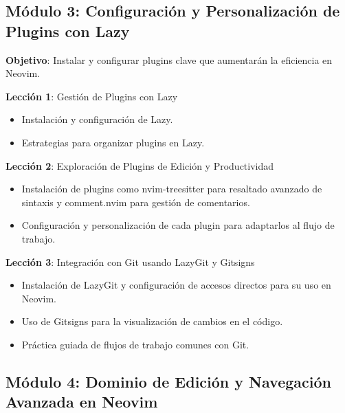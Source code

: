 \documentclass[
  a4paper,
  DIV=11,
  numbers=noendperiod,
  onepage,
  openany]{scrreprt}
\begin{document}
\subsection{\texorpdfstring{\textbf{Módulo 3}: Configuración y
Personalización de Plugins con
Lazy}{Módulo 3: Configuración y Personalización de Plugins con Lazy}}\label{muxf3dulo-3-configuraciuxf3n-y-personalizaciuxf3n-de-plugins-con-lazy}

\textbf{Objetivo}: Instalar y configurar plugins clave que aumentarán la
eficiencia en Neovim.

\textbf{Lección 1}: Gestión de Plugins con Lazy

\begin{itemize}
\item
  Instalación y configuración de Lazy.
\item
  Estrategias para organizar plugins en Lazy.
\end{itemize}

\textbf{Lección 2}: Exploración de Plugins de Edición y Productividad

\begin{itemize}
\item
  Instalación de plugins como nvim-treesitter para resaltado avanzado de
  sintaxis y comment.nvim para gestión de comentarios.
\item
  Configuración y personalización de cada plugin para adaptarlos al
  flujo de trabajo.
\end{itemize}

\textbf{Lección 3}: Integración con Git usando LazyGit y Gitsigns

\begin{itemize}
\item
  Instalación de LazyGit y configuración de accesos directos para su uso
  en Neovim.
\item
  Uso de Gitsigns para la visualización de cambios en el código.
\item
  Práctica guiada de flujos de trabajo comunes con Git.
\end{itemize}

\subsection{\texorpdfstring{\textbf{Módulo 4}: Dominio de Edición y
Navegación Avanzada en
Neovim}{Módulo 4: Dominio de Edición y Navegación Avanzada en Neovim}}\label{muxf3dulo-4-dominio-de-ediciuxf3n-y-navegaciuxf3n-avanzada-en-neovim}
\end{document}
